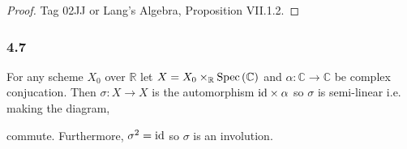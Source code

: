 \documentclass[12pt]{article}
\begin{document}
\begin{proof}
Tag 02JJ or Lang's Algebra, Proposition VII.1.2.
\end{proof}

\subsubsection{4.7}

\newcommand{\R}{\mathbb{R}}
\renewcommand{\C}{\mathbb{C}}

For any scheme $X_0$ over $\R$ let $X = X_0 \times_\R \Spec{\C}$ and $\alpha : \C \to \C$ be complex conjucation. Then $\sigma : X \to X$ is the automorphism $\mathrm{id} \times \alpha$ so $\sigma$ is semi-linear i.e. making the diagram,
\begin{center}
\end{center}
commute. Furthermore, $\sigma^2 = \mathrm{id}$ so $\sigma$ is an involution.
\end{document}
